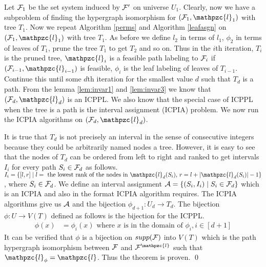 \documentclass{fsttcs}
\def\cA{{\cal A}}
\def\cB{{\cal B}}
\def\cF{{\cal F}}
\def\cL{{\cal L}}
\def\cl{\mathpzc{l}}
\begin{document}
\noindent
Let $\cF_1$ be the set system induced by $\cF'$ on universe $U_1$.
Clearly, now we have a subproblem of finding the
hypergraph isomorphism for $(\cF_1, \cl_1)$ with tree $T_1$.
\noindent
Now we repeat Algorithm \ref{perms} and Algorithm \ref{leafasgn} on
$(\cF_1, \cl_1)$ with tree $T_1$. As before we define $l_2$ in terms
of $l_1$, $\phi_2$ in terms of leaves of $T_1$, prune the tree $T_1$
to get $T_2$ and so on.
Thus in the $i$th iteration, $T_i$ is the pruned tree, $\cl_i$ is a
feasible path labeling to $\cF_i$ if $(\cF_{i-1}, \cl_{i-1})$ is
feasible, $\phi_i$ is the leaf labeling of leaves of
$T_{i-1}$. Continue this until some $d$th iteration for the smallest
value $d$ such that $T_d$ is
a path. From
the lemma \ref{lem:invar1} and \ref{lem:invar3} we know that $(\cF_d, \cl_d)$  is an
ICPPL. We also know that the special case of ICPPL when the tree is a
path is the interval assignment (ICPIA) problem. 
We now
run the ICPIA algorithms \cite{nsnrs09} on $(\cF_d, \cl_d)$.

\noindent
It is true that $T_d$ is not  precisely an interval in the sense of consecutive integers
because they could be arbitrarily named nodes a tree. However, it is easy to see that
the nodes of $T_{d}$ can be ordered from left to right and ranked to get
intervals $I_i$ for every path $S_i \in \cF_d$ as follows. $I_i = \{[l,r]
\mid l = \text{ the lowest rank of the nodes in }\cl_d(S_i) \text{, } r = l+|\cl_d(S_i)|-1
\}$, where $S_i \in \cF_d$. We define an interval assignment $\cA = \{ (S_i, I_i) \mid S_i
\in \cF_d\}$ which is an ICPIA and also in the format ICPIA algorithm
requires. The ICPIA algorithms give us $\cA$ and the bijection $\phi_{d+1} : U_d \rightarrow T_d$. 
The bijection $\phi: U \rightarrow V(T)$ defined as follows is the bijection for the
ICPPL.
\begin{align*}
  \phi(x) &= \phi_i(x) \text{ where $x$ is in the domain of $\phi_i$},
  i \in [d+1]
\end{align*}
It can be verified that $\phi$ is a bijection on $supp(\cF)$ into
$V(T)$ which is the path hypergraph isomorphism between $\cF$ and
$\cF^\cl$ such that $\cl_\phi = \cl$. Thus the theorem is proven.
\qed
\end{document}
